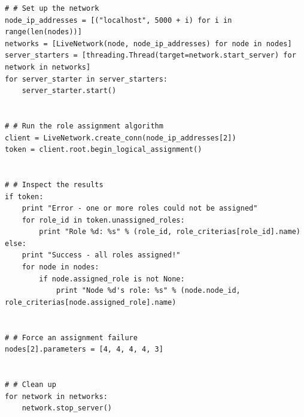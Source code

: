 \documentclass[11pt]{article}
\begin{document}
\begin{lstlisting}
# # Set up the network
node_ip_addresses = [("localhost", 5000 + i) for i in range(len(nodes))]
networks = [LiveNetwork(node, node_ip_addresses) for node in nodes]
server_starters = [threading.Thread(target=network.start_server) for network in networks]
for server_starter in server_starters:
    server_starter.start()


# # Run the role assignment algorithm
client = LiveNetwork.create_conn(node_ip_addresses[2])
token = client.root.begin_logical_assignment()


# # Inspect the results
if token:
    print "Error - one or more roles could not be assigned"
    for role_id in token.unassigned_roles:
        print "Role %d: %s" % (role_id, role_criterias[role_id].name)
else:
    print "Success - all roles assigned!"
    for node in nodes:
        if node.assigned_role is not None:
            print "Node %d's role: %s" % (node.node_id, role_criterias[node.assigned_role].name)


# # Force an assignment failure
nodes[2].parameters = [4, 4, 4, 4, 3]


# # Clean up
for network in networks:
    network.stop_server()


\end{lstlisting}
\end{document}
